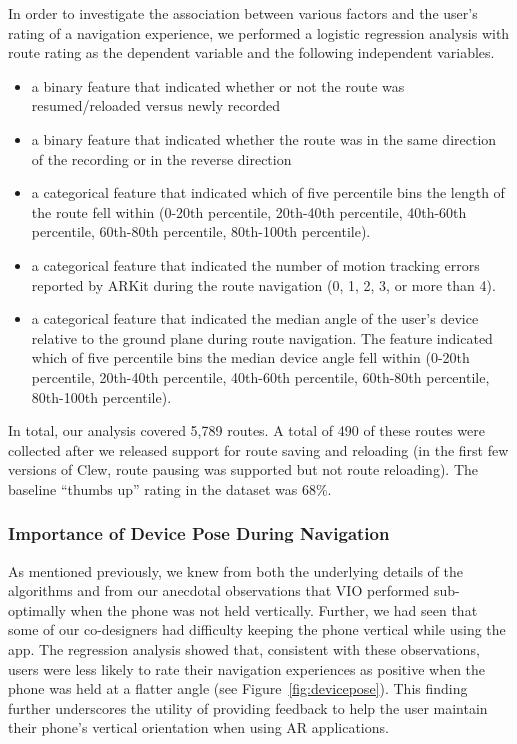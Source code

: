 \documentclass[chi_draft]{sigchi}
\begin{document}
In order to investigate the association between various factors and the user's rating of a navigation experience, we performed a logistic regression analysis with route rating as the dependent variable and the following independent variables.
\begin{itemize}
\item a binary feature that indicated whether or not the route was resumed/reloaded versus newly recorded
\item a binary feature that indicated whether the route was in the same direction of the recording or in the reverse direction
\item a categorical feature that indicated which of five percentile bins the length of the route fell within (0-20th percentile, 20th-40th percentile, 40th-60th percentile, 60th-80th percentile, 80th-100th percentile).
\item a categorical feature that indicated the number of motion tracking errors reported by ARKit during the route navigation (0, 1, 2, 3, or more than 4).
\item a categorical feature that indicated the median angle of the user's device relative to the ground plane during route navigation.  The feature indicated which of five percentile bins the median device angle fell within (0-20th percentile, 20th-40th percentile, 40th-60th percentile, 60th-80th percentile, 80th-100th percentile).
\end{itemize}

In total, our analysis covered 5,789 routes.  A total of 490 of these routes were collected after we released support for route saving and reloading (in the first few versions of Clew, route pausing was supported but not route reloading).  The baseline ``thumbs up'' rating in the dataset was 68\%. 

\subsubsection{Importance of Device Pose During Navigation}


As mentioned previously, we knew from both the underlying details of the algorithms and from our anecdotal observations that VIO performed sub-optimally when the phone was not held vertically.  Further, we had seen that some of our co-designers had difficulty keeping the phone vertical while using the app. The regression analysis showed that, consistent with these observations, users were less likely to rate their navigation experiences as positive when the phone was held at a flatter angle (see Figure~\ref{fig:devicepose}).  This finding further underscores the utility of providing feedback to help the user maintain their phone's vertical orientation when using AR applications.
\end{document}
